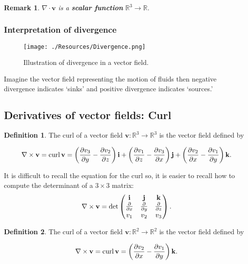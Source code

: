 \documentclass[12pt, a4paper]{article}
\newcommand{\bb}[1]{\mathbb{#1}}
\newcommand{\mb}[1]{\mathbf{#1}}
\DeclareMathOperator{\Curl}{curl}
\newtheorem*{remark}{Remark}
\theoremstyle{definition}
\newtheorem{definition}{Definition}[section]
\theoremstyle{plain}
\begin{document}
\begin{remark}
$\nabla \cdot \mb{v}$ is a \textbf{scalar function} $\bb{R}^3\to \bb{R}.$
\end{remark}

\subsubsection*{Interpretation of divergence}

\begin{figure}[H]
\centering
\texttt{[image: ./Resources/Divergence.png]}
\caption{Illustration of divergence in a vector field.}
\end{figure}

Imagine the vector field representing the motion of fluids then negative divergence indicates `sinks' and positive divergence indicates `sources.'

\subsection{Derivatives of vector fields: Curl}

\begin{definition}
The curl of a vector field $\mb{v} : \bb{R}^3 \to \bb{R}^3$ is the vector field defined by \begin{tcolorbox}
$$\nabla \times \mb{v}=\Curl{\mb{v}}=\left(\pdv{v_3}{y}-\pdv{v_2}{z}\right)\mb{i}+\left(\pdv{v_1}{z}-\pdv{v_3}{x}\right)\mb{j}+\left(\pdv{v_2}{x}-\pdv{v_1}{y}\right)\mb{k}.$$
\end{tcolorbox}
\end{definition}

It is difficult to recall the equation for the curl so, it is easier to recall how to compute the determinant of a $3\times3$ matrix: $$\nabla \times \mb{v} = \det \begin{pmatrix} \mb{i}&\mb{j}&\mb{k} \\ \pdv{}{x}&\pdv{}{y}&\pdv{}{z}\\ v_1&v_2&v_3 \end{pmatrix}.$$

\begin{definition} \label{def:Green's curl}
The curl of a vector field $\mb{v} : \bb{R}^2 \to \bb{R}^2$ is the vector field defined by \begin{tcolorbox}
$$\nabla \times \mb{v} = \Curl{\mb{v}} = \left(\pdv{v_2}{x}-\pdv{v_1}{y}\right)\mb{k}.$$
\end{tcolorbox}
\end{definition}
\end{document}
